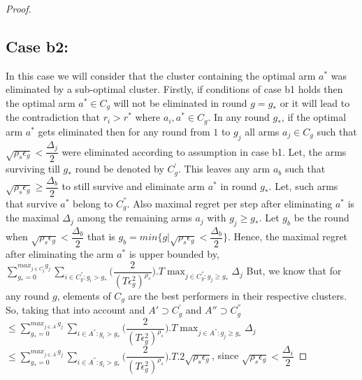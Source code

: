 \begin{proof}
\subsection{Case b2:} 
In this case we will consider that the cluster containing the optimal arm $a^{*}$ was eliminated by a sub-optimal cluster. Firstly, if conditions of case b1 holds then the optimal arm $a^{*}\in C_{g}$ will not be eliminated in round $g=g_{*}$ or it will lead to the contradiction that $r_{i}>r^{*}$ where $a_{i},a^{*}\in C_{g}$. In any round $g_{*}$, if the optimal arm $a^{*}$ gets eliminated then for any round from $1$ to $g_{j}$ all arms $a_{j}\in C_{g}$ such that $\sqrt{\rho_{s}\epsilon_{g}}<\dfrac{\Delta_{j}}{2}$ were eliminated according to assumption in case b1. Let, the arms surviving till $g_{*}$ round be denoted by $C_{g}^{'}$. This leaves any arm $a_{b}$ such that $\sqrt{\rho_{s}\epsilon_{g}}\geq\dfrac{\Delta_{b}}{2}$ to still survive and eliminate arm $a^{*}$ in round $g_{*}$. Let, such arms that survive $a^{*}$ belong to $C_{g}^{''}$. Also maximal regret per step after eliminating $a^{*}$ is the maximal $\Delta_{j}$ among the remaining arms $a_{j}$ with $g_{j}\geq g_{*}$.  Let $g_{b}$ be the round when $\sqrt{\rho_{s}\epsilon_{g}}<\dfrac{\Delta_{b}}{2}$ that is $g_{b}=min\lbrace g|\sqrt{\rho_{s}\epsilon_{g}}<\dfrac{\Delta_{b}}{2}\rbrace$. Hence, the maximal regret after eliminating the arm $a^{*}$ is upper bounded by, 
\newline
$\sum_{g_{*}=0}^{max_{j\in C_{g}^{'}}g_{j}}\sum_{i\in C_{g}^{''}:g_{i}>g_{*}}\bigg(\dfrac{2}{(T\epsilon_{g}^{2})^{\rho_{s}}} \bigg).T\max_{j\in C_{g}^{''}:g_{j}\geq g_{*}}{\Delta}_{j}$
\newline
But, we know that for any round $g$, elements of $C_{g}$ are the best performers in their respective clusters. So, taking that into account and $A'\supset C_{g}^{'}$ and $A''\supset C_{g}^{''}$
\newline
$\leq\sum_{g_{*}=0}^{max_{j\in A^{'}}g_{j}}\sum_{i\in A^{''}:g_{i}>g_{*}}\bigg(\dfrac{2}{(T\epsilon_{g}^{2})^{\rho_{s}}} \bigg).T\max_{j\in A^{''}:g_{j}\geq g_{*}}{\Delta}_{j}$
\newline
\hspace*{0em}$\leq\sum_{g_{*}=0}^{max_{j\in A^{'}}g_{j}}\sum_{i\in A^{''}:g_{i}>g_{*}}\bigg(\dfrac{2}{(T\epsilon_{g}^{2})^{\rho_{s}}} \bigg).T.2\sqrt{\rho_{s}\epsilon_{g}}$, since $\sqrt{\rho_{s}\epsilon_{g}}<\dfrac{\Delta_{i}}{2}$

\end{proof}
